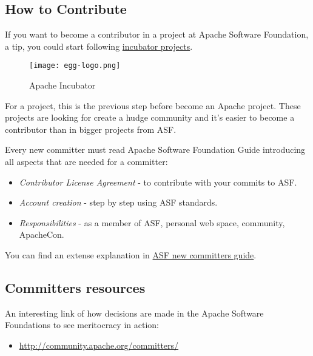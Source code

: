 \subsection{How to Contribute}

\par If you want to become a contributor in a project at Apache Software Foundation, a tip, you could start following \href{http://incubator.apache.org/}{incubator projects}.

\begin{figure}[htp]
    \centering
    \texttt{[image: egg-logo.png]}
    \caption{Apache Incubator}
    \label{egg-logo}
\end{figure}

\par For a project, this is the previous step before become an Apache project. These projects are looking for create a hudge community and it's easier to become a contributor than in bigger projects from ASF.

\par Every new committer must read Apache Software Foundation Guide introducing all aspects that are needed for a committer:

\begin{itemize}
	\item \textit{Contributor License Agreement} - to contribute with your commits to ASF.
	\item \textit{Account creation} - step by step using ASF standards.
	\item \textit{Responsibilities} - as a member of ASF, personal web space, community, ApacheCon.
\end{itemize} You can find an extense explanation in \href{http://www.apache.org/dev/new-committers-guide.html}{ASF new committers guide}.

\subsection{Committers resources}

\par An interesting link of how decisions are made in the Apache Software Foundations to see meritocracy in action:
\begin{itemize}
	\item \url{http://community.apache.org/committers/}
\end{itemize}

